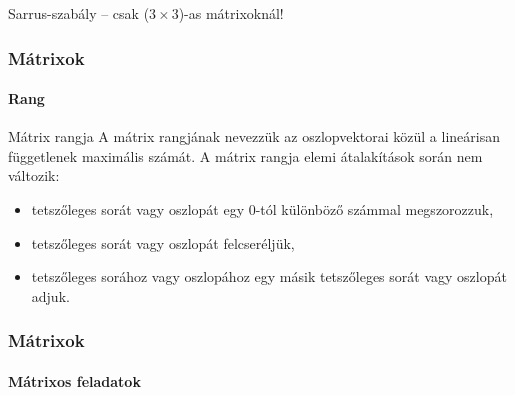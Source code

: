 \begin{frame}
\begin{block}{Sarrus-szabály -- csak ($3 \times 3$)-as mátrixoknál!}
  \end{block}
\end{frame}

\begin{frame}
  \frametitle{Mátrixok}
  \framesubtitle{Rang}

  \begin{block}{Mátrix rangja}
    A mátrix rangjának nevezzük az oszlopvektorai közül a lineárisan függetlenek
    maximális számát. A mátrix rangja elemi átalakítások során nem változik:
    \begin{itemize}
      \item tetszőleges sorát vagy oszlopát egy 0-tól különböző számmal
            megszorozzuk,
      \item tetszőleges sorát vagy oszlopát felcseréljük,
      \item tetszőleges sorához vagy oszlopához egy másik tetszőleges sorát
            vagy oszlopát adjuk.
    \end{itemize}
  \end{block}
\end{frame}

\begin{frame}
  \frametitle{Mátrixok}
  \framesubtitle{Mátrixos feladatok}

  \vfill
  
  \vfill
  
  \vfill
\end{frame}

